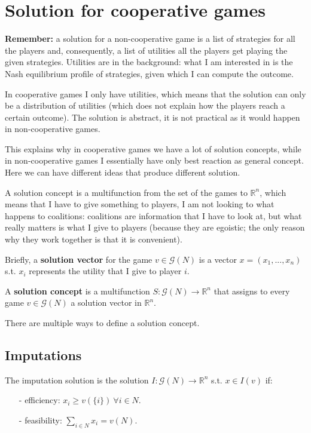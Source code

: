 \section{Solution for cooperative games}

\noindent \textbf{Remember:} a solution for a non-cooperative game is a list 
of strategies for all the players and, consequently, a list of utilities 
all the players get playing the given strategies. Utilities are in the 
background: what I am interested in is the Nash equilibrium profile of 
strategies, given which I can compute the outcome.

\noindent In cooperative games I only have utilities, which means that the 
solution can only be a distribution of utilities (which does not explain 
how the players reach a certain outcome). The solution is abstract, it is 
not practical as it would happen in non-cooperative games.

\noindent This explains why in cooperative games we have a lot of solution 
concepts, while in non-cooperative games I essentially have only best reaction 
as general concept. Here we can have different ideas that produce different 
solution. 

\noindent A solution concept is a multifunction from the set of the games to 
$\mathbb{R}^n$, which means that I have to give something to players, I am 
not looking to what happens to coalitions: coalitions are information that I 
have to look at, but what really matters is what I give to players (because 
they are egoistic; the only reason why they work together is that it is 
convenient).

\noindent Briefly, a \textbf{solution vector} for the game $v \in \mathcal{G}(N)$ is a vector $x = (x_1,...,x_n)$ s.t. $x_i$ represents the utility that I give to player $i$.

\noindent A \textbf{solution concept} is a multifunction $S: \mathcal{G}(N) \rightarrow \mathbb{R}^n$ that assigns to every game $v \in \mathcal{G}(N)$ a solution vector in $\mathbb{R}^n$.

\bigskip
\noindent There are multiple ways to define a solution concept.

\subsection{Imputations}

\noindent The imputation solution is the solution $I: \mathcal{G}(N) \rightarrow \mathbb{R}^n$ s.t. $x \in I(v)$ if:
\begin{itemize}
	\item[-] efficiency: $x_i \geq v(\{i\}) ~\forall i \in N$.
	\item[-] feasibility: $\sum_{i \in N}{x_i} = v(N)$.
\end{itemize}

